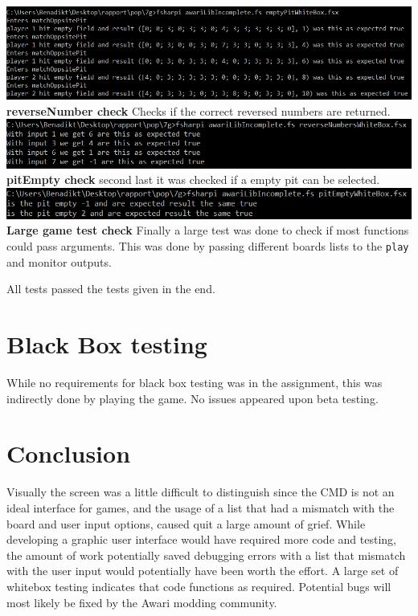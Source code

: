 \documentclass{article}
\begin{document}
        \includegraphics[scale=0.5]{emptyPitWhiteBox.png}
        \\
         \textbf{reverseNumber check}\newline
        Checks if the correct reversed numbers are returned.
        \\
        \includegraphics[scale=0.565]{reverseNumbersWhiteBox.png}
        \\
         \textbf{pitEmpty check}\newline
        second last it was checked if a empty pit can be selected. 
        \\
        \includegraphics[scale=0.6]{pitEmptyWhiteBox.png}
        \\
        \textbf{Large game test check}\newline
        Finally a large test was done to check if most functions could pass arguments. This was done by passing different boards lists to the \verb|play| and monitor outputs. 
      \newline
      
      All tests passed the tests given in the end. 
      
      \section{Black Box testing}
      While no requirements for black box testing was in the assignment, this was indirectly done by playing the game. No issues appeared upon beta testing. 
 
        
        \section{Conclusion}
        Visually the screen was a little difficult to distinguish since the CMD is not an ideal interface for games, and the usage of a list that had a mismatch with the board and user input options, caused quit a large amount of grief. While developing a graphic user interface would have required more code and testing, the amount of work potentially saved debugging errors with a list that mismatch with the user input would potentially have been worth the effort. A  large set of whitebox testing indicates that code functions as required. Potential bugs will most likely be fixed by the Awari modding community.
\end{document}
